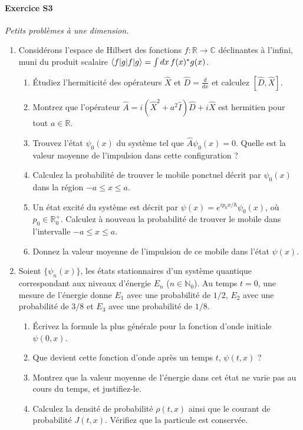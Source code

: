 \paragraph{Exercice S3} \textit{Petits problèmes à une dimension.} 
\begin{enumerate}
\item Considérons l'espace de Hilbert des fonctions $f : \mathbb R \to \mathbb C$ déclinantes à l'infini, muni du produit scalaire $\braket{f|g} = \int dx \, f(x)^*g(x)$.
\begin{enumerate}
\item Étudiez l'hermiticité des opérateurs $\hat X$ et $\hat D = \frac{d}{dx}$ et calculez $[\hat D,\hat X]$.
\item Montrez que l'opérateur $\hat A = i(\hat X^2+a^2\hat I)\hat D + i\hat X$ est hermitien pour tout $a\in\mathbb R$.
\item Trouvez l'état $\psi_0(x)$ du système tel que $\hat A \psi_0(x)=0$. Quelle est la valeur moyenne de l'impulsion dans cette configuration ?
\item Calculez la probabilité de trouver le mobile ponctuel décrit par $\psi_0(x)$ dans la région $-a\leq x \leq a$.
\item Un état excité du système est décrit par $\psi(x) = e^{i p_0 x/\hbar}\psi_0(x)$, où $p_0\in\mathbb R^+_0$. Calculez à nouveau la probabilité de trouver le mobile dans l'intervalle $-a\leq x\leq a$.
\item Donnez la valeur moyenne de l'impulsion de ce mobile dans l'état $\psi(x)$.
\end{enumerate}
\item Soient $\lbrace \psi_n(x) \rbrace$, les états stationnaires d'un système quantique correspondant aux niveaux d'énergie $E_n$ ($n\in\mathbb N_0$). Au temps $t=0$, une mesure de l'énergie donne $E_1$ avec une probabilité de $1/2$, $E_2$ avec une probabilité de $3/8$ et $E_3$ avec une probabilité de $1/8$.
\begin{enumerate}
\item Écrivez la formule la plus générale pour la fonction d'onde initiale $\psi(0,x)$.
\item Que devient cette fonction d'onde après un temps $t$, $\psi(t,x)$ ?
\item Montrez que la valeur moyenne de l'énergie dans cet état ne varie pas au cours du temps, et justifiez-le.
\item Calculez la densité de probabilité $\rho(t,x)$ ainsi que le courant de probabilité $J(t,x)$. Vérifiez que la particule est conservée.

\end{enumerate}
\end{enumerate}
